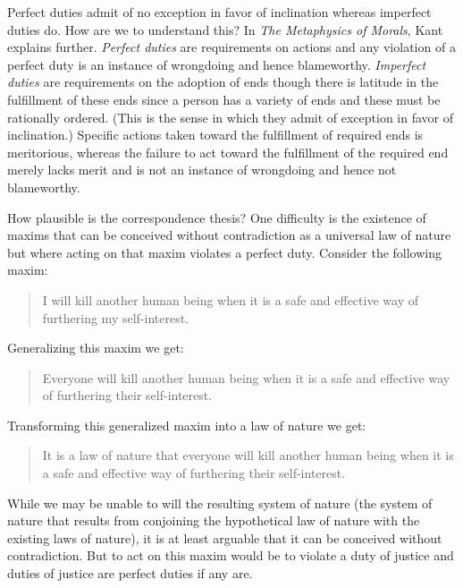 Perfect duties admit of no exception in favor of inclination whereas imperfect duties do. How are we to understand this? In \emph{The Metaphysics of Morals}, Kant explains further. \emph{Perfect duties} are requirements on actions and any violation of a perfect duty is an instance of wrongdoing and hence blameworthy. \emph{Imperfect duties} are requirements on the adoption of ends though there is latitude in the fulfillment of these ends since a person has a variety of ends and these must be rationally ordered. (This is the sense in which they admit of exception in favor of inclination.) Specific actions taken toward the fulfillment of required ends is meritorious, whereas the failure to act toward the fulfillment of the required end merely lacks merit and is not an instance of wrongdoing and hence not blameworthy.

How plausible is the correspondence thesis? One difficulty is the existence of maxims that can be conceived without contradiction as a universal law of nature but where acting on that maxim violates a perfect duty. Consider the following maxim:

\begin{quote}
	I will kill another human being when it is a safe and effective way of furthering my self-interest.
\end{quote}

Generalizing this maxim we get:

\begin{quote}
	Everyone will kill another human being when it is a safe and effective way of furthering their self-interest.
\end{quote}

Transforming this generalized maxim into a law of nature we get:

\begin{quote}
	It is a law of nature that everyone will kill another human being when it is a safe and effective way of furthering their self-interest.
\end{quote}

While we may be unable to will the resulting system of nature (the system of nature that results from conjoining the hypothetical law of nature with the existing laws of nature), it is at least arguable that it can be conceived without contradiction. But to act on this maxim would be to violate a duty of justice and duties of justice are perfect duties if any are. \change

